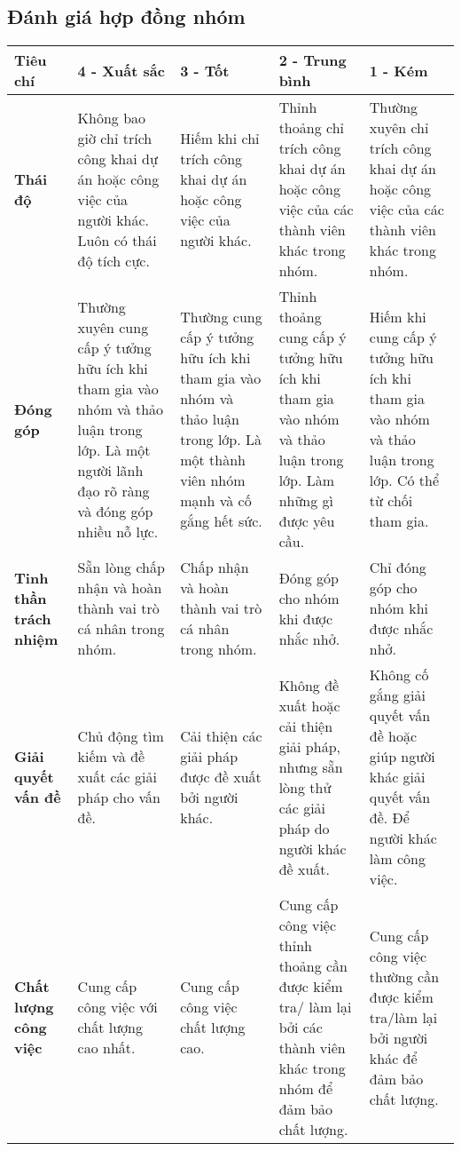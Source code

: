 \documentclass[a4paper, 12pt]{article}
\begin{document}
\subsection{Đánh giá hợp đồng nhóm}
\begin{tabular}{|p{2cm}|p{3cm}|p{3cm}|p{3cm}|p{3cm}|}
    \hline
    \textbf{Tiêu chí} & \textbf{4 - Xuất sắc} & \textbf{3 - Tốt} & \textbf{2 - Trung bình} & \textbf{1 - Kém}\\
    \hline
    \textbf{Thái độ} & Không bao giờ chỉ trích công khai dự án hoặc công việc của người khác. Luôn có thái độ tích cực. & Hiếm khi chỉ trích công khai dự án hoặc công việc của người khác. & Thỉnh thoảng chỉ trích công khai dự án hoặc công việc của các thành viên khác trong nhóm. & Thường xuyên chỉ trích công khai dự án hoặc công việc của các thành viên khác trong nhóm.\\
    \hline
    \textbf{Đóng góp} & Thường xuyên cung cấp ý tưởng hữu ích khi tham gia vào nhóm và thảo luận trong lớp. Là một người lãnh đạo rõ ràng và đóng góp nhiều nỗ lực. & Thường cung cấp ý tưởng hữu ích khi tham gia vào nhóm và thảo luận trong lớp. Là một thành viên nhóm mạnh và cố gắng hết sức. & Thỉnh thoảng cung cấp ý tưởng hữu ích khi tham gia vào nhóm và thảo luận trong lớp. Làm những gì được yêu cầu. & Hiếm khi cung cấp ý tưởng hữu ích khi tham gia vào nhóm và thảo luận trong lớp. Có thể từ chối tham gia.\\
    \hline
    \textbf{Tinh thần trách nhiệm} & Sẵn lòng chấp nhận và hoàn thành vai trò cá nhân trong nhóm. & Chấp nhận và hoàn thành vai trò cá nhân trong nhóm. & Đóng góp cho nhóm khi được nhắc nhở. & Chỉ đóng góp cho nhóm khi được nhắc nhở.\\
    \hline
    \textbf{Giải quyết vấn đề} & Chủ động tìm kiếm và đề xuất các giải pháp cho vấn đề. & Cải thiện các giải pháp được đề xuất bởi người khác. & Không đề xuất hoặc cải thiện giải pháp, nhưng sẵn lòng thử các giải pháp do người khác đề xuất. & Không cố gắng giải quyết vấn đề hoặc giúp người khác giải quyết vấn đề. Để người khác làm công việc.\\
    \hline
    \textbf{Chất lượng công việc} & Cung cấp công việc với chất lượng cao nhất. & Cung cấp công việc chất lượng cao. & Cung cấp công việc thỉnh thoảng cần được kiểm tra/ làm lại bởi các thành viên khác trong nhóm để đảm bảo chất lượng. & Cung cấp công việc thường cần được kiểm tra/làm lại bởi người khác để đảm bảo chất lượng.\\
    \hline
\end{tabular}
\end{document}
